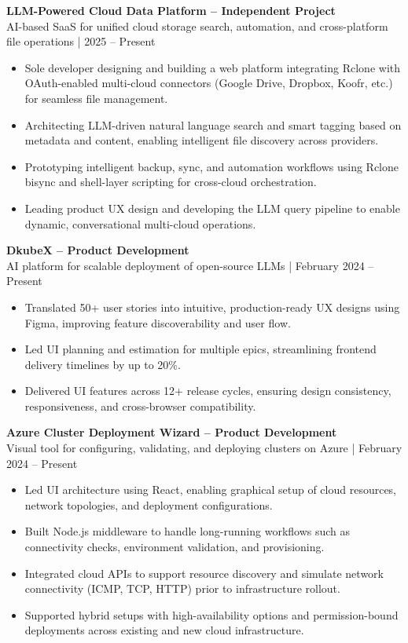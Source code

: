 \documentclass[11pt, a4paper]{article}
\newcommand{\smallgray}[1]{\textcolor{darkgray!90}{\small #1}}
\begin{document}
\textbf{LLM-Powered Cloud Data Platform – Independent Project} \\
\smallgray{AI-based SaaS for unified cloud storage search, automation, and cross-platform file operations | 2025 -- Present}
\begin{itemize}
    \item Sole developer designing and building a web platform integrating Rclone with OAuth-enabled multi-cloud connectors (Google Drive, Dropbox, Koofr, etc.) for seamless file management.
    \item Architecting LLM-driven natural language search and smart tagging based on metadata and content, enabling intelligent file discovery across providers.
    \item Prototyping intelligent backup, sync, and automation workflows using Rclone bisync and shell-layer scripting for cross-cloud orchestration.
    \item Leading product UX design and developing the LLM query pipeline to enable dynamic, conversational multi-cloud operations.
\end{itemize}

\textbf{DkubeX – Product Development} \\
\smallgray{AI platform for scalable deployment of open-source LLMs | February 2024 -- Present}
\begin{itemize}
    \item Translated 50+ user stories into intuitive, production-ready UX designs using Figma, improving feature discoverability and user flow.
    \item Led UI planning and estimation for multiple epics, streamlining frontend delivery timelines by up to 20\%.
    \item Delivered UI features across 12+ release cycles, ensuring design consistency, responsiveness, and cross-browser compatibility.
\end{itemize}

\textbf{Azure Cluster Deployment Wizard – Product Development} \\
\smallgray{Visual tool for configuring, validating, and deploying clusters on Azure | February 2024 -- Present}
\begin{itemize}
    \item Led UI architecture using React, enabling graphical setup of cloud resources, network topologies, and deployment configurations.
    \item Built Node.js middleware to handle long-running workflows such as connectivity checks, environment validation, and provisioning.
    \item Integrated cloud APIs to support resource discovery and simulate network connectivity (ICMP, TCP, HTTP) prior to infrastructure rollout.
    \item Supported hybrid setups with high-availability options and permission-bound deployments across existing and new cloud infrastructure.
\end{itemize}
\end{document}
